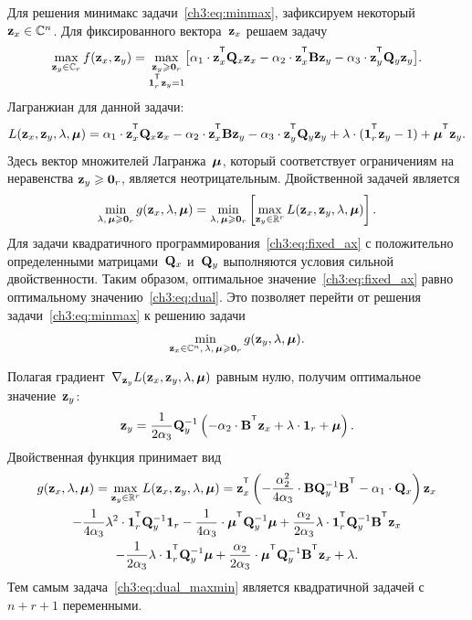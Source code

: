 \documentclass[11pt, a5paper]{dissert}
\begin{document}
Для решения минимакс задачи~\eqref{ch3:eq:minmax}, зафиксируем некоторый~$\mathbf{z}_x \in \mathbb{C}^n$. Для фиксированного вектора~$\mathbf{z}_x$ решаем задачу
\begin{equation}
	\max_{\bz_y \in \mathbb{C}_r} f(\bz_x, \bz_y) = \max_{\substack{\bz_y \geq \bZero_r \\ \bOne_r^{\T}\bz_y=1}} \bigl[\alpha_1 \cdot \bz_x^{\T} \bQ_x \bz_x - \alpha_2 \cdot \bz_x^{\T} \bB \bz_y - \alpha_3 \cdot \bz_y^{\T} \bQ_y \bz_y \bigr].
	\label{ch3:eq:fixed_ax}
\end{equation}
Лагранжиан для данной задачи:
\begin{equation*}
	L(\bz_x, \bz_y, \lambda, \bmu) = \alpha_1 \cdot \bz_x^{\T} \bQ_x \bz_x - \alpha_2 \cdot \bz_x^{\T} \bB \bz_y - \alpha_3 \cdot \bz_y^{\T} \bQ_y \bz_y + \lambda \cdot  (\bOne_r^{\T} \bz_y - 1) + \bmu^{\T} \bz_y.
\end{equation*}
Здесь вектор множителей Лагранжа~$\boldsymbol{\mu}$, который соответствует ограничениям на неравенства $\mathbf{z}_y \geqslant \boldsymbol{0}_r$, является неотрицательным.
Двойственной задачей является
\begin{equation}
	\min_{\lambda, \, \boldsymbol{\mu} \geqslant \boldsymbol{0}_r} g(\mathbf{z}_x, \lambda, \boldsymbol{\mu}) = \min_{\lambda, \, \boldsymbol{\mu} \geqslant \boldsymbol{0}_r}  \left[\max_{\mathbf{z}_y \in \mathbb{R}^r} L(\mathbf{z}_x, \mathbf{z}_y, \lambda, \boldsymbol{\mu}) \right].
	\label{ch3:eq:dual}
\end{equation}
Для задачи квадратичного программирования~\eqref{ch3:eq:fixed_ax} с положительно определенными матрицами~$\mathbf{Q}_x$ и~$\mathbf{Q}_y$ выполняются условия сильной двойственности. Таким образом, оптимальное значение~\eqref{ch3:eq:fixed_ax} равно оптимальному значению~\eqref{ch3:eq:dual}. Это позволяет перейти от решения задачи~\eqref{ch3:eq:minmax} к решению задачи
\begin{equation}
\min_{\mathbf{z}_x \in \mathbb{C}^n, \, \lambda, \, \boldsymbol{\mu} \geqslant \boldsymbol{0}_r} g(\mathbf{z}_y, \lambda, \boldsymbol{\mu}).
\label{ch3:eq:dual_maxmin}
\end{equation}

Полагая градиент~$\nabla_{\mathbf{z}_y} L(\mathbf{z}_x, \mathbf{z}_y, \lambda, \boldsymbol{\mu})$ равным нулю, получим оптимальное значение~$\mathbf{z}_y$:
\begin{equation*}
	\bz_y = \frac{1}{2\alpha_3} \bQ_y^{-1} \left( - \alpha_2 \cdot \bB^{\T} \bz_x +\lambda \cdot \bOne_r + \bmu \right).
\end{equation*}
Двойственная функция принимает вид
\begin{multline}
	g(\bz_x, \lambda, \bmu)
	= \max_{\bz_y \in \bbR^r} L(\bz_x, \bz_y, \lambda, \bmu) =
	\bz_x^{\T} \left( - \frac{\alpha_2^2}{4\alpha_3} \cdot \bB \bQ_y^{-1} \bB^{\T} - \alpha_1 \cdot \bQ_x\right) \bz_x \\ - \frac{1}{4 \alpha_3} \lambda^2 \cdot \bOne_r^{\T} \bQ_y^{-1} \bOne_r - \frac{1}{4 \alpha_3} \cdot \bmu^{\T} \bQ_y^{-1} \bmu + \frac{\alpha_2}{2 \alpha_3} \lambda \cdot \bOne_r^{\T} \bQ_y^{-1} \bB^{\T} \bz_x \\ - \frac{1}{2 \alpha_3} \lambda \cdot \bOne_r^{\T} \bQ_y^{-1} \bmu + \frac{\alpha_2}{2 \alpha_3} \cdot \bmu^{\T} \bQ_y^{-1} \bB^{\T} \bz_x + \lambda.
	\label{ch3:eq:dual_quadratic_form}
\end{multline}
Тем самым задача~\eqref{ch3:eq:dual_maxmin} является квадратичной задачей с~$n + r + 1$ переменными.
\end{document}
